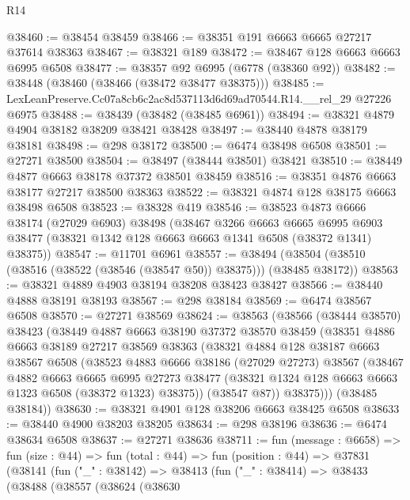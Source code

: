 \begin{lexlean}{R14}
\begin{coremodule}
@38460 := @38454 @38459
@38466 := @38351 @191 @6663 @6665 @27217 @37614 @38363
@38467 := @38321 @189
@38472 := @38467 @128 @6663 @6663 @6995 @6508
@38477 := @38357 @92 @6995 (@6778 (@38360 @92))
@38482 := @38448 (@38460 (@38466 (@38472 @38477 @38375)))
@38485 := LexLeanPreserve.Cc07a8cb6c2ac8d537113d6d69ad70544.R14.__rel_29 @27226 @6975
@38488 := @38439 (@38482 (@38485 @6961))
@38494 := @38321 @4879 @4904 @38182 @38209 @38421 @38428
@38497 := @38440 @4878 @38179 @38181
@38498 := @298 @38172
@38500 := @6474 @38498 @6508
@38501 := @27271 @38500
@38504 := @38497 (@38444 @38501) @38421
@38510 := @38449 @4877 @6663 @38178 @37372 @38501 @38459
@38516 := @38351 @4876 @6663 @38177 @27217 @38500 @38363
@38522 := @38321 @4874 @128 @38175 @6663 @38498 @6508
@38523 := @38328 @419
@38546 := @38523
    @4873
    @6666
    @38174
    (@27029 @6903)
    @38498
    (@38467
      @3266
      @6663
      @6665
      @6995
      @6903
      @38477
      (@38321 @1342 @128 @6663 @6663 @1341 @6508 (@38372 @1341) @38375))
@38547 := @11701 @6961
@38557 := @38494 (@38504 (@38510 (@38516 (@38522 (@38546 (@38547 @50)) @38375))) (@38485 @38172))
@38563 := @38321 @4889 @4903 @38194 @38208 @38423 @38427
@38566 := @38440 @4888 @38191 @38193
@38567 := @298 @38184
@38569 := @6474 @38567 @6508
@38570 := @27271 @38569
@38624 := @38563
    (@38566
      (@38444 @38570)
      @38423
      (@38449
        @4887
        @6663
        @38190
        @37372
        @38570
        @38459
        (@38351
          @4886
          @6663
          @38189
          @27217
          @38569
          @38363
          (@38321
            @4884
            @128
            @38187
            @6663
            @38567
            @6508
            (@38523
              @4883
              @6666
              @38186
              (@27029 @27273)
              @38567
              (@38467
                @4882
                @6663
                @6665
                @6995
                @27273
                @38477
                (@38321 @1324 @128 @6663 @6663 @1323 @6508 (@38372 @1323) @38375))
              (@38547 @87))
            @38375)))
      (@38485 @38184))
@38630 := @38321 @4901 @128 @38206 @6663 @38425 @6508
@38633 := @38440 @4900 @38203 @38205
@38634 := @298 @38196
@38636 := @6474 @38634 @6508
@38637 := @27271 @38636
@38711 := fun (message : @6658) =>
  fun (size : @44) =>
  fun (total : @44) =>
  fun (position : @44) =>
  @37831
    (@38141
      (fun ("_" : @38142) =>
      @38413
        (fun ("_" : @38414) =>
        @38433
          (@38488
            (@38557
              (@38624
                (@38630

\end{coremodule}
\end{lexlean}
